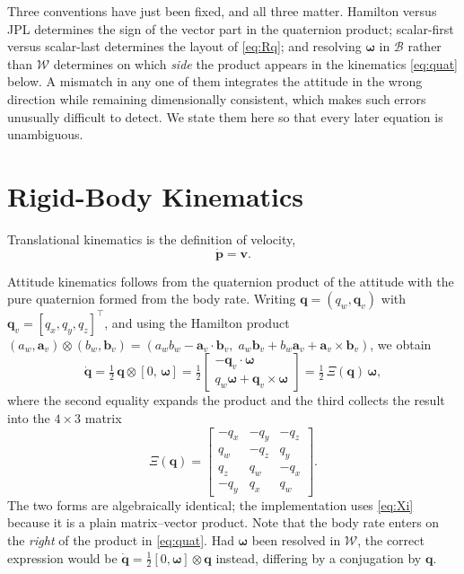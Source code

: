 Three conventions have just been fixed, and all three matter. Hamilton
versus JPL determines the sign of the vector part in the quaternion
product; scalar-first versus scalar-last determines the layout of
\eqref{eq:Rq}; and resolving $\bm{\omega}$ in $\mathcal{B}$ rather than
$\mathcal{W}$ determines on which \emph{side} the product appears in the
kinematics \eqref{eq:quat} below. A mismatch in any one of them
integrates the attitude in the wrong direction while remaining
dimensionally consistent, which makes such errors unusually difficult to
detect. We state them here so that every later equation is unambiguous.

\section{Rigid-Body Kinematics}\label{sec:model:kin}

Translational kinematics is the definition of velocity,
\begin{equation}
\dot{\bm{p}} = \bm{v}.
\label{eq:kin}
\end{equation}

Attitude kinematics follows from the quaternion product of the attitude
with the pure quaternion formed from the body rate. Writing
$\bm{q} = (q_w, \bm{q}_v)$ with $\bm{q}_v = [q_x, q_y, q_z]^{\!\top}$,
and using the Hamilton product
$(a_w, \bm{a}_v) \otimes (b_w, \bm{b}_v) =
(a_w b_w - \bm{a}_v \!\cdot\! \bm{b}_v,\;
a_w \bm{b}_v + b_w \bm{a}_v + \bm{a}_v \!\times\! \bm{b}_v)$,
we obtain
\begin{equation}
\dot{\bm{q}} = \tfrac{1}{2}\, \bm{q} \otimes [0,\, \bm{\omega}]
= \tfrac{1}{2}
\begin{bmatrix}
-\bm{q}_v \cdot \bm{\omega} \\[2pt]
q_w \bm{\omega} + \bm{q}_v \times \bm{\omega}
\end{bmatrix}
= \tfrac{1}{2}\, \Xi(\bm{q})\, \bm{\omega},
\label{eq:quat}
\end{equation}
where the second equality expands the product and the third collects the
result into the $4 \times 3$ matrix
\begin{equation}
\Xi(\bm{q}) =
\begin{bmatrix}
-q_x & -q_y & -q_z \\
 q_w & -q_z &  q_y \\
 q_z &  q_w & -q_x \\
-q_y &  q_x &  q_w
\end{bmatrix}.
\label{eq:Xi}
\end{equation}
The two forms are algebraically identical; the implementation uses
\eqref{eq:Xi} because it is a plain matrix--vector product. Note that the
body rate enters on the \emph{right} of the product in \eqref{eq:quat}.
Had $\bm{\omega}$ been resolved in $\mathcal{W}$, the correct expression
would be $\dot{\bm{q}} = \tfrac{1}{2} [0, \bm{\omega}] \otimes \bm{q}$
instead, differing by a conjugation by $\bm{q}$.

